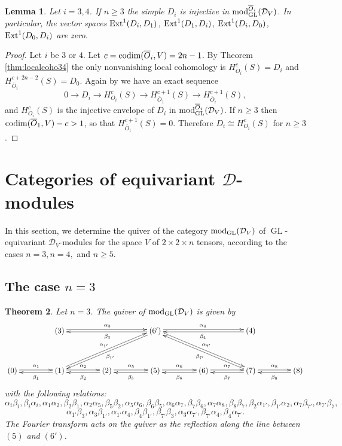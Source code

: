 \documentclass[11pt,reqno]{amsart}
\renewcommand{\a}{\alpha}
\renewcommand{\b}{\beta}
\newcommand{\D}{\mathcal{D}}
\newcommand{\tn}{\textnormal}
\newcommand{\GL}{\operatorname{GL}}
\newtheorem{theorem}{Theorem}[section]
\newtheorem{lemma}[theorem]{Lemma}
\numberwithin{equation}{section}
\begin{document}
\begin{lemma}\label{lemmaExt34}
Let $i=3,4$. If $n\geq 3$ the simple $D_i$ is injective in $\tn{mod}_{\tn{GL}}^{\overline{O}_i}(\D_V)$. In particular, the vector spaces $\tn{Ext}^1(D_i,D_1)$, $\tn{Ext}^1(D_1,D_i)$, $\tn{Ext}^1(D_i,D_0)$, $\tn{Ext}^1(D_0,D_i)$ are zero.	
\end{lemma}

\begin{proof}
Let $i$ be $3$ or $4$. Let $c=\tn{codim}(\overline{O}_i,V)=2n-1$. By Theorem \ref{thm:localcoho34} the only nonvanishing local cohomology is $H^c_{\overline{O}_i}(S)=D_i$ and $H^{c+2n-2}_{\overline{O}_i}(S)=D_0$. Again by \cite[Lemma 3.11]{lHorincz2019categories} we have an exact sequence
$$
0\longrightarrow D_i\longrightarrow H^c_{O_i}(S)\longrightarrow H^{c+1}_{\overline{O}_1}(S)\longrightarrow H^{c+1}_{\overline{O}_i}(S),
$$
and $H^c_{O_i}(S)$ is the injective envelope of $D_i$ in $\tn{mod}_{\tn{GL}}^{\overline{O}_i}(\D_V)$. If $n\geq 3$ then $\tn{codim}(\overline{O}_1,V)-c>1$, so that $H^{c+1}_{\overline{O}_1}(S)=0$. Therefore $D_i\cong H^c_{O_i}(S)$ for $n\geq 3$.
\end{proof}


\section{Categories of equivariant $\D$-modules}\label{sec:eqcat}

In this section, we determine the quiver of the category $\tn{mod}_{\GL}(\D_V)$ of $\GL$-equivariant $\D_V$-modules for the space $V$ of $2\times 2 \times n$ tensors, according to the cases $n=3, n=4,$ and $n\geq 5$.

\subsection{The case $n=3$}\label{sec:n3}

\begin{theorem}\label{thm:quiv3}
Let $n=3$. The quiver of $\tn{mod}_{\GL}(\D_V)$ is given by
\[\xymatrix@R+1pc@C+1.6pc{
& (3) \ar@<0.5ex>[rr]^{\a_3} & & \ar@<0.2ex>[ll]^{\b_3} \ar@<0.2ex>[dll]^{\b_{1'}} (6') \ar@<0.5ex>[rr]^{\a_4} \ar@<0.5ex>[drr]^{\a_{7'}}& & \ar@<0.2ex>[ll]^{\b_4} (4) & \\
(0) \ar@<0.3ex>[r]^{\a_1} & \ar@<0.5ex>[l]^{\b_1}  (1) \ar@<0.3ex>[r]^{\a_2} \ar@<0.5ex>[urr]^{\a_{1'}}& \ar@<0.5ex>[l]^{\b_2} (2) \ar@<0.3ex>[r]^{\a_5} & \ar@<0.5ex>[l]^{\b_5} (5) \ar@<0.3ex>[r]^{\a_6} & \ar@<0.5ex>[l]^{\b_6} (6) \ar@<0.3ex>[r]^{\a_7} & \ar@<0.5ex>[l]^{\b_7} \ar@<0.2ex>[ull]^{\b_{7'}} (7) \ar@<0.3ex>[r]^{\a_8} & \ar@<0.5ex>[l]^{\b_8} (8)
}\]
with the following relations: 
\[\a_i \b_i, \b_i \a_i 
, \a_1 \a_2, \b_2 \b_1, \a_2 \a_5, \b_5\b_2, \a_5\a_6, \b_6 \b_5, \a_6 \a_7, \b_7 \b_6, \a_7 \a_8, \b_8 \b_7, \b_2\a_{1'}, \b_{1'}\a_2, \a_7\b_{7'}, \a_{7'}\b_7,\]
\[\a_{1'}\b_3, \a_{3}\b_{1'}, \a_{1'}\a_4, \b_4\b_{1'}, \b_{7'}\b_3, \a_3\a_{7'}, \b_{7'}\a_4, \b_4\a_{7'}.\]
The Fourier transform acts on the quiver as the reflection along the line between $(5)$ and $(6')$.
\end{theorem}
\end{document}
